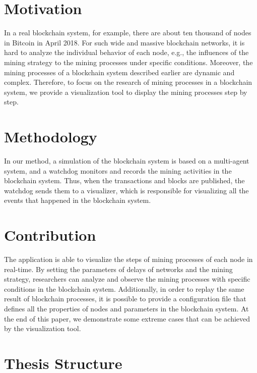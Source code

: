 \section{Motivation}

In a real blockchain system, for example, there are about ten thousand of nodes in Bitcoin in April 2018. For such wide and massive blockchain networks, it is hard to analyze the individual behavior of each node, e.g., the influences of the mining strategy to the mining processes under specific conditions. Moreover, the mining processes of a blockchain system described earlier are dynamic and complex. Therefore, to focus on the research of mining processes in a blockchain system, we provide a visualization tool to display the mining processes step by step.

\section{Methodology}

In our method, a simulation of the blockchain system is based on a multi-agent system, and a watchdog monitors and records the mining activities in the blockchain system. Thus, when the transactions and blocks are published, the watchdog sends them to a visualizer, which is responsible for visualizing all the events that happened in the blockchain system. 

\section{Contribution}

The application is able to visualize the steps of mining processes of each node in real-time. By setting the parameters of delays of networks and the mining strategy, researchers can analyze and observe the mining processes with specific conditions in the blockchain system. Additionally, in order to replay the same result of blockchain processes, it is possible to provide a configuration file that defines all the properties of nodes and parameters in the blockchain system. At the end of this paper, we demonstrate some extreme cases that can be achieved by the visualization tool.

\section{Thesis Structure}
